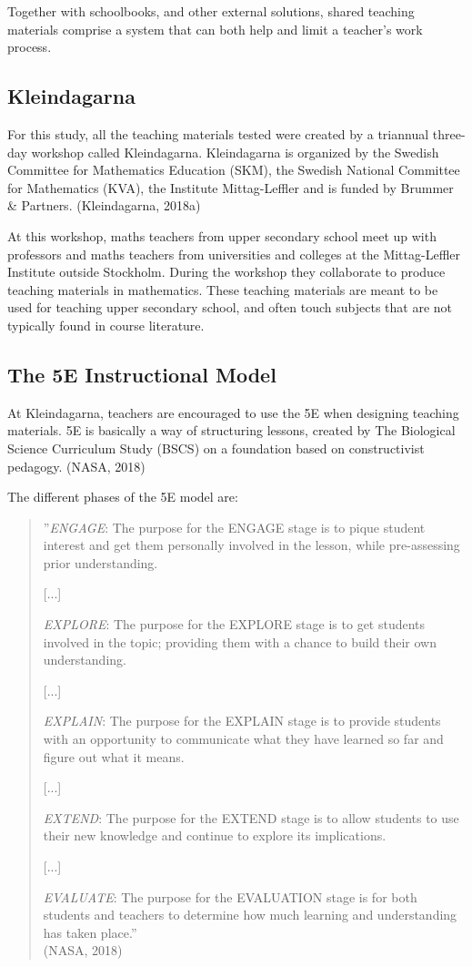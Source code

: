 Together with schoolbooks, and other external solutions, shared teaching materials comprise a system that can both help and limit a teacher's work process.

\subsection{Kleindagarna}
For this study, all the teaching materials tested were created by a triannual three-day workshop called Kleindagarna. Kleindagarna is organized by the Swedish Committee for Mathematics Education (SKM), the Swedish National Committee for Mathematics (KVA), the Institute Mittag-Leffler and is funded by Brummer \& Partners. (Kleindagarna, 2018a)

At this workshop, maths teachers from upper secondary school meet up with professors and maths teachers from universities and colleges at the Mittag-Leffler Institute outside Stockholm. During the workshop they collaborate to produce teaching materials in mathematics. These teaching materials are meant to be used for teaching upper secondary school, and often touch subjects that are not typically found in course literature.

\subsection{The 5E Instructional Model}
At Kleindagarna, teachers are encouraged to use the 5E when designing teaching materials. 5E is basically a way of structuring lessons, created by The Biological Science Curriculum Study (BSCS) on a foundation based on constructivist pedagogy. (NASA, 2018)

The different phases of the 5E model are:

\begin{quote}
''\textit{ENGAGE}: The purpose for the ENGAGE stage is to pique student interest and get them personally involved in the lesson, while pre-assessing prior understanding.

[...]

\textit{EXPLORE}: The purpose for the EXPLORE stage is to get students involved in the topic; providing them with a chance to build their own understanding.

[...]

\textit{EXPLAIN}: The purpose for the EXPLAIN stage is to provide students with an opportunity to communicate what they have learned so far and figure out what it means.

[...]

\textit{EXTEND}: The purpose for the EXTEND stage is to allow students to use their new knowledge and continue to explore its implications.

[...]

\textit{EVALUATE}: The purpose for the EVALUATION stage is for both students and teachers to determine how much learning and understanding has taken place.''\\
(NASA, 2018)
\end{quote}

